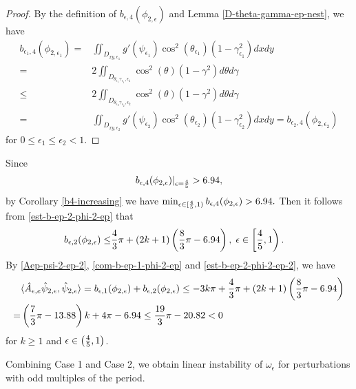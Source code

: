 \documentclass[1 [leqno, 11pt]{amsart}
\numberwithin{equation}{section}
\let\ep=\epsilon
\begin{document}
\begin{CJK*}{GBK}{song}
\begin{proof}
By the definition of $ b_{\ep,4}(\phi_{2,\ep})$ and Lemma \ref{D-theta-gamma-ep-nest}, we have
\begin{align*}
b_{\ep_1,4}(\phi_{2,\ep_1})=
&\iint_{D_{xy,\ep_1}}g'(\psi_{\ep_1}) \cos^2\left(\theta_{\ep_1}\right)(1-\gamma_{\ep_1}^2)dxdy\\
=&2\iint_{D_{\theta_{\ep_1}\gamma_{\ep_1},\ep_1}}\cos^2\left(\theta\right)(1-\gamma^2)d\theta d\gamma\\
\leq &2\iint_{D_{\theta_{\ep_2}\gamma_{\ep_2},\ep_2}}\cos^2\left(\theta\right)(1-\gamma^2)d\theta d\gamma\\
=&\iint_{D_{xy,\ep_2}}g'(\psi_{\ep_2})
\cos^2\left(\theta_{\ep_2}\right)(1-\gamma_{\ep_2}^2)dxdy=b_{\ep_2,4}(\phi_{2,\ep_2})
\end{align*}
for $0\leq \ep_1\leq \ep_2<1$.
\end{proof}
Since
\begin{align*}
b_{\ep,4}({\phi}_{2,\ep})|_{\ep={4\over5}}>6.94,
\end{align*}
by Corollary \ref{b4-increasing} we have $\min_{\ep\in[{4\over5},1)}b_{\ep,4}({\phi}_{2,\ep})>6.94.$
Then it follows from \eqref{est-b-ep-2-phi-2-ep} that
\begin{align}\label{est-b-ep-2-phi-2-ep-2}
 b_{\ep, 2}({\phi}_{2,\ep})
 \leq &{4\over3} \pi+(2k+1)\left({8\over3} \pi-6.94\right),\;\ep\in \left[{4\over5},1\right).
 \end{align}
By \eqref{Aep-psi-2-ep-2}, \eqref{com-b-ep-1-phi-2-ep} and \eqref{est-b-ep-2-phi-2-ep-2}, we have
 \begin{align}\nonumber
 &\langle\hat{A}_{\ep,e} \hat{\psi}_{2,\ep}, \hat{\psi}_{2,\ep}\rangle
=b_{\ep, 1}({\phi}_{2,\ep}) + b_{\ep, 2}({\phi}_{2,\ep})\leq -3k\pi+{4\over3} \pi+(2k+1)\left({8\over3} \pi-6.94\right)\\\label{A-ep-e-psi-2-neg}
=& \left({7\over 3}\pi-13.88\right)k+4\pi-6.94\leq {19\over 3}\pi-20.82<0
 \end{align}
 for $k\geq1$ and $\ep\in \left({4\over5},1\right)$.
 \medskip

 Combining Case 1  and Case 2, we obtain linear instability of $\omega_\ep$ for perturbations with odd multiples of the period.


\end{CJK*}
\end{document}
